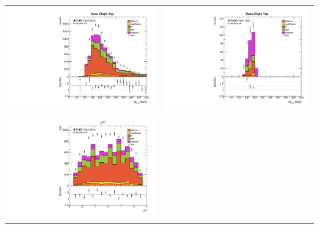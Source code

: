 \documentclass[10pt]{beamer}
\begin{document}
\begin{frame}
	\begin{center}
		\begin{tabular}{cc}
			
			\includegraphics[scale=0.22]{SingleTopMass} &
			
			\includegraphics[scale=0.22]{SingleTopMass_cuts} \\
			
			\includegraphics[scale=0.22]{qEta} &
			

\end{tabular}
\end{center}
\end{frame}
\end{document}
